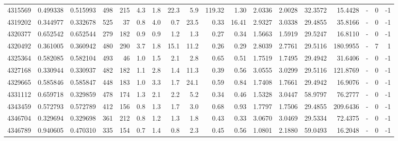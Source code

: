 \begin{tabular}{rrrrrrrrrrrrrrrlrr}
   4315569 & 0.499338 &   0.515993 &  498 &  215 &      4.3 &      1.8 &    22.3 &      5.9 &     119.32 &        1.30 &  2.0336 &  2.0028 &   32.3572 &   15.4428 &             - &        0 &         -1 \\
   4319202 & 0.344977 &   0.332678 &  525 &   37 &      0.8 &      4.0 &     0.7 &     23.5 &       0.33 &       16.41 &  2.9327 &  3.0338 &   29.4855 &   35.8166 &             - &        0 &         -1 \\
   4320377 & 0.652542 &   0.652544 &  279 &  182 &      0.9 &      0.9 &     1.2 &      1.3 &       0.27 &        0.34 &  1.5663 &  1.5919 &   29.5247 &   16.8110 &             - &        0 &         -1 \\
   4320492 & 0.361005 &   0.360942 &  480 &  290 &      3.7 &      1.8 &    15.1 &     11.2 &       0.26 &        0.29 &  2.8039 &  2.7761 &   29.5116 &  180.9955 &             - &        7 &          1 \\
   4325364 & 0.582085 &   0.582104 &  493 &   46 &      1.0 &      1.5 &     2.1 &      2.8 &       0.65 &        0.51 &  1.7519 &  1.7495 &   29.4942 &   31.6406 &             - &        0 &         -1 \\
   4327168 & 0.330944 &   0.330937 &  482 &  182 &      1.1 &      2.8 &     1.4 &     11.3 &       0.39 &        0.56 &  3.0555 &  3.0299 &   29.5116 &  121.8769 &             - &        0 &         -1 \\
   4329665 & 0.585846 &   0.585847 &  448 &  183 &      1.0 &      3.3 &     1.7 &     24.1 &       0.59 &        0.84 &  1.7408 &  1.7661 &   29.4942 &   16.9076 &             - &        0 &         -1 \\
   4331112 & 0.659718 &   0.329859 &  478 &  174 &      1.3 &      2.1 &     2.2 &      5.2 &       0.34 &        0.46 &  1.5328 &  3.0447 &   58.9797 &   76.2777 &             - &        0 &         -1 \\
   4343459 & 0.572793 &   0.572789 &  412 &  156 &      0.8 &      1.3 &     1.7 &      3.0 &       0.68 &        0.93 &  1.7797 &  1.7506 &   29.4855 &  209.6436 &             - &        0 &         -1 \\
   4346704 & 0.329694 &   0.329698 &  361 &  212 &      0.8 &      1.2 &     1.3 &      1.8 &       0.43 &        0.33 &  3.0670 &  3.0469 &   29.5334 &   72.4375 &             - &        0 &         -1 \\
   4346789 & 0.940605 &   0.470310 &  335 &  154 &      0.7 &      1.4 &     0.8 &      2.3 &       0.45 &        0.56 &  1.0801 &  2.1880 &   59.0493 &   16.2048 &             - &        0 &         -1 \\

\end{tabular}

